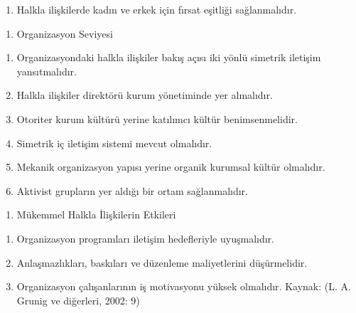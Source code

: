 \documentclass[
]{book}
\providecommand{\tightlist}{%
  \setlength{\itemsep}{0pt}\setlength{\parskip}{0pt}}
\begin{document}
\begin{enumerate}
\def\labelenumi{\arabic{enumi}.}
\setcounter{enumi}{7}
\tightlist
\item
  Halkla ilişkilerde kadın ve erkek için fırsat eşitliği sağlanmalıdır.
\end{enumerate}

\begin{enumerate}
\def\labelenumi{\Roman{enumi}.}
\setcounter{enumi}{2}
\tightlist
\item
  Organizasyon Seviyesi
\end{enumerate}

\begin{enumerate}
\def\labelenumi{\arabic{enumi}.}
\setcounter{enumi}{8}
\tightlist
\item
  Organizasyondaki halkla ilişkiler bakış açısı iki yönlü simetrik iletişim yansıtmalıdır.
\item
  Halkla ilişkiler direktörü kurum yönetiminde yer almalıdır.
\item
  Otoriter kurum kültürü yerine katılımcı kültür benimsenmelidir.
\item
  Simetrik iç iletişim sistemi mevcut olmalıdır.
\item
  Mekanik organizasyon yapısı yerine organik kurumsal kültür olmalıdır.
\item
  Aktivist grupların yer aldığı bir ortam sağlanmalıdır.
\end{enumerate}

\begin{enumerate}
\def\labelenumi{\Roman{enumi}.}
\setcounter{enumi}{3}
\tightlist
\item
  Mükemmel Halkla İlişkilerin Etkileri
\end{enumerate}

\begin{enumerate}
\def\labelenumi{\arabic{enumi}.}
\setcounter{enumi}{14}
\tightlist
\item
  Organizasyon programları iletişim hedefleriyle uyuşmalıdır.
\item
  Anlaşmazlıkları, baskıları ve düzenleme maliyetlerini düşürmelidir.
\item
  Organizasyon çalışanlarının iş motivasyonu yüksek olmalıdır.
  Kaynak: (L. A. Grunig ve diğerleri, 2002: 9) \citep{grunig2002excellent}
\end{enumerate}
\end{document}
